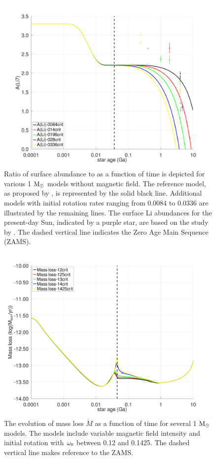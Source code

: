 \documentclass[fleqn,usenatbib]{mnras}
\begin{document}
\begin{figure}
	\includegraphics[clip, width=\columnwidth]{figures/paper2/li_var_vel_0_0g_0.pdf}
    \caption{Ratio of surface  abundance to  as a function of time is depicted for various 1 $\mathrm{M}_\odot$ models without magnetic field. The reference model, as proposed by \citet{Choi2016}, is represented by the solid black line. Additional models with initial rotation rates ranging from 0.0084 to 0.0336 are illustrated by the remaining lines. The surface Li abundances for the present-day Sun, indicated by a purple star, are based on the study by \citet{Asplund2009}. The dashed vertical line indicates the Zero Age Main Sequence (ZAMS).}
    \label{fig:li_var_vel_0g}
\end{figure}

\begin{figure}
	\includegraphics[clip,width=\columnwidth]{figures/paper2/mdot_var_vel_g3.pdf}
    \caption{The evolution of mass loss $\Dot{M}$ as a function of time for several 1 $\mathrm{M}_\odot$ models. The models include variable magnetic field intensity and initial rotation with $\omega_{\mathrm{0}}$ between 0.12 and 0.1425. The dashed vertical line makes reference to the ZAMS.}
    \label{fig:mdot_var_vel_g3}
\end{figure}
\end{document}
